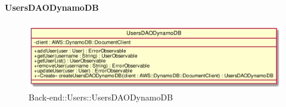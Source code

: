 \hypertarget{UsersDAODynamoDB_label}{\paragraph{UsersDAODynamoDB}}
\begin{figure}[h]
	\centering
	\includegraphics[width=\textwidth,height=\textheight,keepaspectratio]{images/ClassUsersDAODynamoDB.png}
	\caption{Back-end::Users::UsersDAODynamoDB}
\end{figure}
